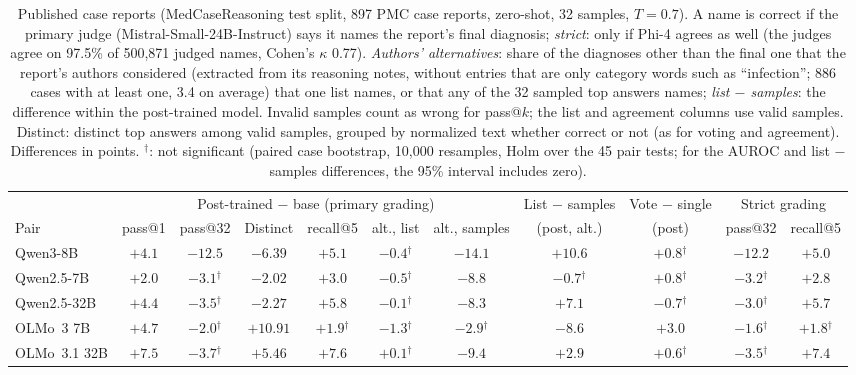 \documentclass[11pt]{article}
\begin{document}
\begin{table}[t]
\medskip
\begin{adjustbox}{max width=\linewidth}
\begin{tabular}{lcccccccccc}
\toprule
 & \multicolumn{6}{c}{Post-trained $-$ base (primary grading)} & List $-$ samples & Vote $-$ single & \multicolumn{2}{c}{Strict grading} \\
Pair & pass@1 & pass@32 & Distinct & recall@5 & alt., list & alt., samples & (post, alt.) & (post) & pass@32 & recall@5 \\
\midrule
Qwen3-8B & $+4.1$ & $-12.5$ & $-6.39$ & $+5.1$ & $-0.4$$^{\dagger}$ & $-14.1$ & $+10.6$ & $+0.8$$^{\dagger}$ & $-12.2$ & $+5.0$ \\
Qwen2.5-7B & $+2.0$ & $-3.1$$^{\dagger}$ & $-2.02$ & $+3.0$ & $-0.5$$^{\dagger}$ & $-8.8$ & $-0.7$$^{\dagger}$ & $+0.8$$^{\dagger}$ & $-3.2$$^{\dagger}$ & $+2.8$ \\
Qwen2.5-32B & $+4.4$ & $-3.5$$^{\dagger}$ & $-2.27$ & $+5.8$ & $-0.1$$^{\dagger}$ & $-8.3$ & $+7.1$ & $-0.7$$^{\dagger}$ & $-3.0$$^{\dagger}$ & $+5.7$ \\
OLMo~3 7B & $+4.7$ & $-2.0$$^{\dagger}$ & $+10.91$ & $+1.9$$^{\dagger}$ & $-1.3$$^{\dagger}$ & $-2.9$$^{\dagger}$ & $-8.6$ & $+3.0$ & $-1.6$$^{\dagger}$ & $+1.8$$^{\dagger}$ \\
OLMo~3.1 32B & $+7.5$ & $-3.7$$^{\dagger}$ & $+5.46$ & $+7.6$ & $+0.1$$^{\dagger}$ & $-9.4$ & $+2.9$ & $+0.6$$^{\dagger}$ & $-3.5$$^{\dagger}$ & $+7.4$ \\
\bottomrule
\end{tabular}
\end{adjustbox}
\caption{Published case reports (MedCaseReasoning test split, 897 PMC case reports, zero-shot, 32 samples, $T{=}0.7$). A name is correct if the primary judge (Mistral-Small-24B-Instruct) says it names the report's final diagnosis; \emph{strict}: only if Phi-4 agrees as well (the judges agree on 97.5\% of 500,871 judged names, Cohen's $\kappa$ 0.77). \emph{Authors' alternatives}: share of the diagnoses other than the final one that the report's authors considered (extracted from its reasoning notes, without entries that are only category words such as ``infection''; 886 cases with at least one, 3.4 on average) that one list names, or that any of the 32 sampled top answers names; \emph{list $-$ samples}: the difference within the post-trained model. Invalid samples count as wrong for pass@$k$; the list and agreement columns use valid samples. Distinct: distinct top answers among valid samples, grouped by normalized text whether correct or not (as for voting and agreement). Differences in points. $^{\dagger}$: not significant (paired case bootstrap, 10,000 resamples, Holm over the 45 pair tests; for the AUROC and list $-$ samples differences, the 95\% interval includes zero).}
\label{tab:medcase}
\end{table}
\end{document}
